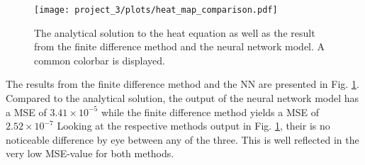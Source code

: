 


\begin{figure}[h!]
    \centering
    \texttt{[image: project\_3/plots/heat\_map\_comparison.pdf]}
    \caption{The analytical solution to the heat equation as well as the result from the finite difference method and the neural network model. A common colorbar is displayed. 
    }
    \label{fig:heatmaps}
\end{figure}

The results from the finite difference method and the NN are presented in Fig. \ref{fig:heatmaps}.
Compared to the analytical solution, the output of the neural network model has a MSE of $ 3.41 \times 10^{-5}$ while the finite difference method yields a MSE of $2.52 \times 10^{-7}$
Looking at the respective methods output in Fig. \ref{fig:heatmaps}, their is no noticeable difference by eye between any of the three.  
This is well reflected in the very low MSE-value for both methods. 

